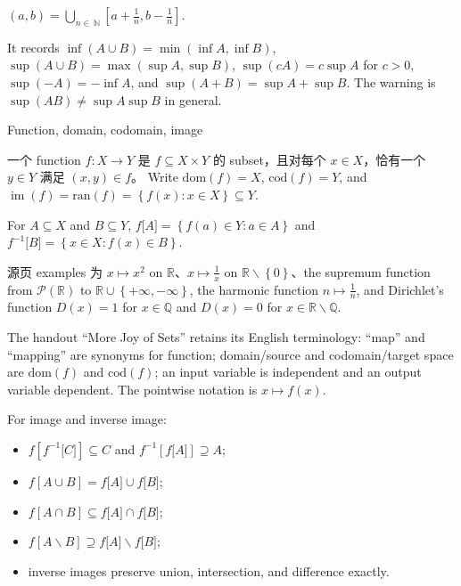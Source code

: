 \(\left( {a,b} \right) = \bigcup_{n \in \ \mathbb{N}}\left\lbrack {a + \frac{1}{n},b - \frac{1}{n}} \right\rbrack\).

It records \(\inf\left( {A \cup B} \right) = \min\left( {\inf A,\inf B} \right)\), \(\sup\left( {A \cup B} \right) = \max\left( {\sup A,\sup B} \right)\), \(\sup\left( {cA} \right) = c\sup A\) for \(c > 0\), \(\sup\left( {- A} \right) = - \inf A\), and \(\sup\left( {A + B} \right) = \sup A + \sup B\). The warning is \(\sup\left( {AB} \right) \neq \sup A\sup B\) in general.

\begin{definition}{Function, domain, codomain, image}

一个 function \(f:X\rightarrow Y\) 是 \(f \subseteq X \times Y\) 的 subset，且对每个 \(x \in X\)，恰有一个 \(y \in Y\) 满足 \(\left( {x,y} \right) \in f\)。 Write \(\text{dom}(f) = X\), \(\text{cod}(f) = Y\), and \(\operatorname{im}(f) = \text{ran}(f) = \left\{ {f(x):x \in X} \right\} \subseteq Y\).

For \(A \subseteq X\) and \(B \subseteq Y\), \(f\lbrack A\rbrack = \left\{ {f(a) \in Y:a \in A} \right\}\) and \(f^{- 1}\lbrack B\rbrack = \left\{ {x \in X:f(x) \in B} \right\}\).

\end{definition}

源页 examples 为 \(x\mapsto x^{2}\) on \(\mathbb{R}\)、\(x\mapsto\frac{1}{x}\) on \(\mathbb{R} \smallsetminus \left\{ 0 \right\}\)、the supremum function from \(\mathcal{P}\left( \mathbb{R} \right)\) to \(\mathbb{R} \cup \left\{ {+ \infty, - \infty} \right\}\), the harmonic function \(n\mapsto\frac{1}{n}\), and Dirichlet's function \(D(x) = 1\) for \(x \in \mathbb{Q}\) and \(D(x) = 0\) for \(x \in \mathbb{R} \smallsetminus \mathbb{Q}\).

The handout ``More Joy of Sets'' retains its English terminology: ``map'' and ``mapping'' are synonyms for function; domain/source and codomain/target space are \(\text{dom}(f)\) and \(\text{cod}(f)\); an input variable is independent and an output variable dependent. The pointwise notation is \(x\mapsto f(x)\).

For image and inverse image:

\begin{itemize}
\tightlist
\item
  \(f\left\lbrack {f^{- 1}\lbrack C\rbrack} \right\rbrack \subseteq C\) and \(f^{- 1}\left\lbrack {f\lbrack A\rbrack} \right\rbrack \supseteq A\);
\item
  \(f\left\lbrack {A \cup B} \right\rbrack = f\lbrack A\rbrack \cup f\lbrack B\rbrack\);
\item
  \(f\left\lbrack {A \cap B} \right\rbrack \subseteq f\lbrack A\rbrack \cap f\lbrack B\rbrack\);
\item
  \(f\left\lbrack {A \smallsetminus B} \right\rbrack \supseteq f\lbrack A\rbrack \smallsetminus f\lbrack B\rbrack\);
\item
  inverse images preserve union, intersection, and difference exactly.
\end{itemize}

